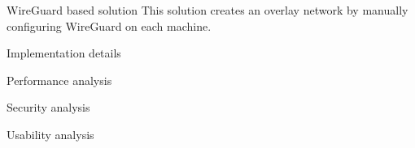\hypertarget{thesis__060-wireguard.md}{}
\begin{frame}{WireGuard based solution}
\protect\hypertarget{thesis__060-wireguard.md__wireguard-based-solution}{}
This solution creates an overlay network by manually configuring
WireGuard on each machine.

\begin{block}{Implementation details}
\protect\hypertarget{thesis__060-wireguard.md__implementation-details}{}
\end{block}

\begin{block}{Performance analysis}
\protect\hypertarget{thesis__060-wireguard.md__performance-analysis}{}
\end{block}

\begin{block}{Security analysis}
\protect\hypertarget{thesis__060-wireguard.md__security-analysis}{}
\end{block}

\begin{block}{Usability analysis}
\protect\hypertarget{thesis__060-wireguard.md__usability-analysis}{}
\end{block}
\end{frame}

